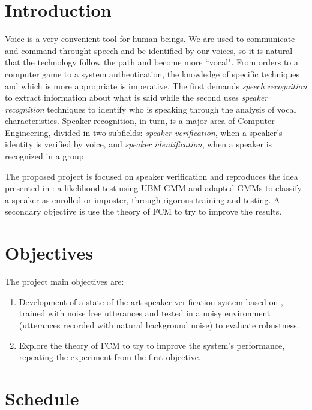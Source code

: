 \documentclass[a4paper,twocolumn]{article}
\begin{document}
\section{Introduction}
\label{ch:introduction}

Voice is a very convenient tool for human beings. We are used to communicate and command throught speech and be identified by our voices, so it is natural that the technology follow the path and become more ``vocal". From orders to a computer game to a system authentication, the knowledge of specific techniques and which is more appropriate is imperative. The first demands \textit{speech recognition} to extract information about what is said while the second uses \textit{speaker recognition} techniques to identify who is speaking through the analysis of vocal characteristics. Speaker recognition, in turn, is a major area of Computer Engineering, divided in two subfields: \textit{speaker verification}, when a speaker's identity is verified by voice, and \textit{speaker identification}, when a speaker is recognized in a group.

The proposed project is focused on speaker verification and reproduces the idea presented in \cite{reynolds_et_al_2000}: a likelihood test using UBM-GMM and adapted GMMs to classify a speaker as enrolled or imposter, through rigorous training and testing. A secondary objective is use the theory of FCM \cite{gao_et_al_2013} to try to improve the results.


\section{Objectives}
\label{ch:objectives}

The project main objectives are:

\begin{enumerate}[noitemsep]
    \item Development of a state-of-the-art speaker verification system based on \cite{reynolds_et_al_2000}, trained with noise free utterances and tested in a noisy environment (utterances recorded with natural background noise) to evaluate robustness.
    \item Explore the theory of FCM to try to improve the system's performance, repeating the experiment from the first objective.
\end{enumerate}


\section{Schedule}
\label{ch:schedule}
\end{document}
